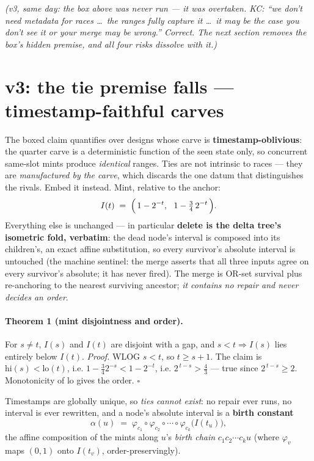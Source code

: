 \documentclass[11pt]{article}
\begin{document}
\medskip
\noindent\emph{(v3, same day: the box above was never run --- it was
overtaken. KC: ``we don't need metadata for races \dots\ the ranges
fully capture it \dots\ it may be the case you don't see it or your
merge may be wrong.'' Correct. The next section removes the box's hidden
premise, and all four risks dissolve with it.)}

\section{v3: the tie premise falls --- timestamp-faithful carves}
\label{sec:v3}

The boxed claim quantifies over designs whose carve is
\textbf{timestamp-oblivious}: the quarter carve is a deterministic
function of the seen state only, so concurrent same-slot mints produce
\emph{identical} ranges. Ties are not intrinsic to races --- they are
\emph{manufactured by the carve}, which discards the one datum that
distinguishes the rivals. Embed it instead. Mint, relative to the
anchor:
\[
  I(t) \;=\; \Bigl(\,1 - 2^{-t},\ \ 1 - \tfrac34\,2^{-t}\,\Bigr).
\]
Everything else is unchanged --- in particular \textbf{delete is the
delta tree's isometric fold, verbatim}: the dead node's interval is
composed into its children's, an exact affine substitution, so every
survivor's absolute interval is untouched (the machine sentinel: the
merge asserts that all three inputs agree on every survivor's absolute;
it has never fired). The merge is OR-set survival plus re-anchoring to
the nearest surviving ancestor; \emph{it contains no repair and never
decides an order}.

\paragraph{Theorem 1 (mint disjointness and order).} For $s \ne t$,
$I(s)$ and $I(t)$ are disjoint with a gap, and $s < t \Rightarrow I(s)$
lies entirely below $I(t)$.
\emph{Proof.} WLOG $s < t$, so $t \ge s+1$. The claim is
$\mathrm{hi}(s) < \mathrm{lo}(t)$, i.e.
$1 - \tfrac34 2^{-s} < 1 - 2^{-t}$, i.e. $2^{\,t-s} > \tfrac43$ ---
true since $2^{\,t-s} \ge 2$. Monotonicity of $\mathrm{lo}$ gives the
order. $\square$

\noindent Timestamps are globally unique, so \emph{ties cannot exist}:
no repair ever runs, no interval is ever rewritten, and a node's
absolute interval is a \textbf{birth constant}
\[
  \alpha(u) \;=\; \varphi_{c_1} \circ \varphi_{c_2} \circ \cdots \circ
  \varphi_{c_k}\bigl(I(t_u)\bigr),
\]
the affine composition of the mints along $u$'s \emph{birth chain}
$c_1 c_2 \cdots c_k u$ (where $\varphi_v$ maps $(0,1)$ onto $I(t_v)$,
order-preservingly).
\end{document}
